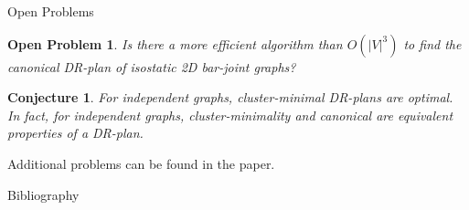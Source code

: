 \documentclass{mySlides}
\newcommand{\term}[1]{\textit{#1}}
\newtheorem{openproblem}{\sffamily Open Problem}
\newtheorem{conjecture}{\sffamily Conjecture}
\begin{document}
\begin{frame}{Open Problems}
    \begin{openproblem}
        Is there a more efficient algorithm than $O(|V|^3)$ to find the canonical DR-plan of isostatic 2D bar-joint graphs?
    \end{openproblem}

    \begin{conjecture}
    \label{conj:mfaisoptimal:rephrase}
        For independent graphs, \term{cluster-minimal} DR-plans are optimal. In fact, for independent graphs, cluster-minimality and canonical are equivalent properties of a DR-plan.
    \end{conjecture}

    Additional problems can be found in the paper.
\end{frame}




\begin{frame}[allowframebreaks]{Bibliography}
    
    
\end{frame}

% 
% 
\end{document}
